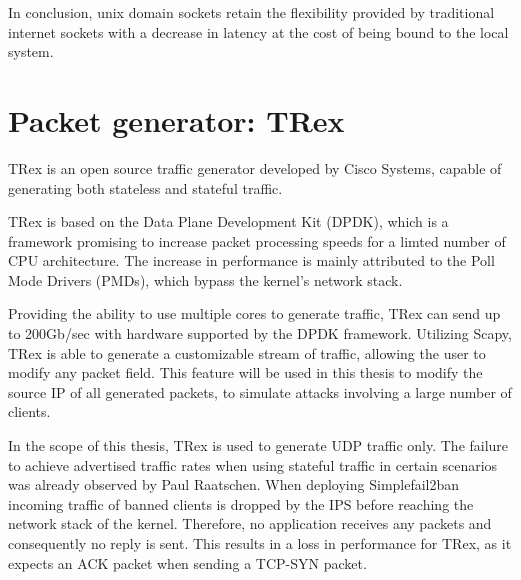 In conclusion, unix domain sockets retain the flexibility provided by traditional internet sockets with a decrease in latency at the cost of being bound to the local system.

\section{Packet generator: TRex}
TRex is an open source traffic generator developed by Cisco Systems, capable of generating both stateless and stateful traffic\cite{trex}.

TRex is based on the Data Plane Development Kit (DPDK), which is a framework promising to increase packet processing speeds for a limted number of CPU architecture.
The increase in performance is mainly attributed to the Poll Mode Drivers (PMDs), which bypass the kernel's network stack.\cite{dpdk}

Providing the ability to use multiple cores to generate traffic, TRex can send up to 200Gb/sec with hardware supported by the DPDK framework.
Utilizing Scapy, TRex is able to generate a customizable stream of traffic, allowing the user to modify any packet field.
This feature will be used in this thesis to modify the source IP of all generated packets, to simulate attacks involving a large number of clients.\cite{trex}

In the scope of this thesis, TRex is used to generate UDP traffic only.
The failure to achieve advertised traffic rates when using stateful traffic in certain scenarios was already observed by Paul Raatschen\cite{raatschen:ipc}.
When deploying Simplefail2ban incoming traffic of banned clients is dropped by the IPS before reaching the network stack of the kernel.
Therefore, no application receives any packets and consequently no reply is sent.
This results in a loss in performance for TRex, as it expects an ACK packet when sending a TCP-SYN packet.
